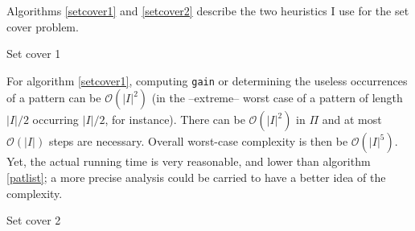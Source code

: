 \documentclass[a4paper,10pt]{article}
\newcommand{\bigO}[1]{\mathcal O\left( #1 \right)}
\begin{document}
Algorithms \ref{setcover1} and \ref{setcover2} describe the two heuristics I use for the set cover problem.


\begin{algorithm}
\caption{Set cover 1 \label{setcover1}}
   
 


\end{algorithm}

For algorithm \ref{setcover1}, computing \texttt{gain} or determining the useless occurrences of a pattern can be $\bigO{|I|^2}$ (in the --extreme-- worst case of a pattern of length $|I|/2$ occurring $|I|/2$, for instance). There can be $\bigO{|I|^2}$ in $\Pi$ and at most $\bigO{|I|}$ steps are necessary. Overall worst-case complexity is then be $\bigO{|I|^5}$. Yet, the actual running time is very reasonable, and lower than algorithm \ref{patlist}; a more precise analysis could be carried to have a better idea of the complexity.

\begin{algorithm}
\caption{Set cover 2 \label{setcover2}}
    
  


\end{algorithm}
\end{document}
